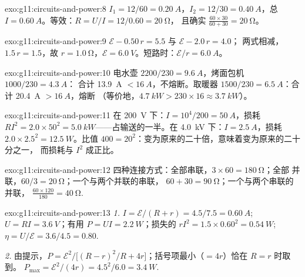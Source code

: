 \begin{solution}{exo:g11:circuits-and-power:8}
$I_1 = 12/60 = \qty{0.20}{A}$，$I_2 = 12/30 = \qty{0.40}{A}$，总
$I = \qty{0.60}{A}$。等效：$R = U/I = 12/0.60 = \qty{20}{\ohm}$，
且确实 $\frac{60 \times 30}{60 + 30} = \qty{20}{\ohm}$。
\end{solution}

\begin{solution}{exo:g11:circuits-and-power:9}
$\mathcal{E} - 0.50\,r = 5.5$ 与 $\mathcal{E} - 2.0\,r = 4.0$；
两式相减，$1.5\,r = 1.5$，故 $r = \qty{1.0}{\ohm}$，$\mathcal{E} =
\qty{6.0}{V}$。短路时：$\mathcal{E}/r = \qty{6.0}{A}$。
\end{solution}

\begin{solution}{exo:g11:circuits-and-power:10}
电水壶 $2200/230 = \qty{9.6}{A}$，烤面包机 $1000/230 = \qty{4.3}{A}$：
合计 \qty{13.9}{A} $< \qty{16}{A}$，不熔断。取暖器 $1500/230 =
\qty{6.5}{A}$：合计 \qty{20.4}{A} $> \qty{16}{A}$，熔断
（等价地，$\qty{4.7}{kW} > 230 \times 16 \approx \qty{3.7}{kW}$）。
\end{solution}

\begin{solution}{exo:g11:circuits-and-power:11}
在 \qty{200}{V} 下：$I = 10^4/200 = \qty{50}{A}$，损耗 $RI^2 = 2.0 \times
50^2 = \qty{5.0}{kW}$——占输送的一半。在 \qty{4.0}{kV} 下：$I =
\qty{2.5}{A}$，损耗 $2.0 \times 2.5^2 = \qty{12.5}{W}$。比值 $400 =
20^2$：变为原来的二十倍，意味着变为原来的二十分之一，
而损耗与 $I^2$ 成正比。
\end{solution}

\begin{solution}{exo:g11:circuits-and-power:12}
四种连接方式：全部串联，$3 \times 60 = \qty{180}{\ohm}$；全部
并联，$60/3 = \qty{20}{\ohm}$；一个与两个并联的串联，
$60 + 30 = \qty{90}{\ohm}$；一个与两个串联的并联，
$\frac{60 \times 120}{180} = \qty{40}{\ohm}$.
\end{solution}

\begin{solution}{exo:g11:circuits-and-power:13}
\emph{1.} $I = \mathcal{E}/(R + r) = 4.5/7.5 = \qty{0.60}{A}$;
$U = RI = \qty{3.6}{V}$；有用 $P = UI = \qty{2.2}{W}$；损失的 $rI^2 =
1.5 \times 0.60^2 = \qty{0.54}{W}$; $\eta = U/\mathcal{E} = 3.6/4.5 =
0.80$.

\emph{2.} 由提示，$P = \mathcal{E}^2 \big/ \big[(R - r)^2/R +
4r\big]$；括号项最小（$= 4r$）恰在 $R = r$ 时取到。
$P_{\max} = \mathcal{E}^2/(4r) = 4.5^2/6.0 = \qty{3.4}{W}$.
\end{solution}

